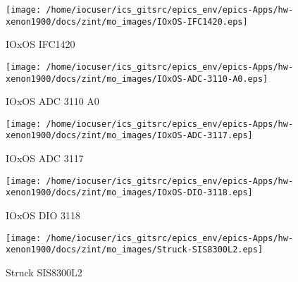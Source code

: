 \noindent
\vspace{1.4cm}
\begin{minipage}{.2\textwidth}
\begin{center}
\texttt{[image: /home/iocuser/ics\_gitsrc/epics\_env/epics-Apps/hw-xenon1900/docs/zint/mo\_images/IOxOS-IFC1420.eps]}
\end{center}
\end{minipage}
\begin{minipage}{.7\textwidth}
IOxOS IFC1420
\end{minipage}


\noindent
\vspace{1.4cm}
\begin{minipage}{.2\textwidth}
\begin{center}
\texttt{[image: /home/iocuser/ics\_gitsrc/epics\_env/epics-Apps/hw-xenon1900/docs/zint/mo\_images/IOxOS-ADC-3110-A0.eps]}
\end{center}
\end{minipage}
\begin{minipage}{.7\textwidth}
IOxOS ADC 3110 A0
\end{minipage}


\noindent
\vspace{1.4cm}
\begin{minipage}{.2\textwidth}
\begin{center}
\texttt{[image: /home/iocuser/ics\_gitsrc/epics\_env/epics-Apps/hw-xenon1900/docs/zint/mo\_images/IOxOS-ADC-3117.eps]}
\end{center}
\end{minipage}
\begin{minipage}{.7\textwidth}
IOxOS ADC 3117
\end{minipage}


\noindent
\vspace{1.4cm}
\begin{minipage}{.2\textwidth}
\begin{center}
\texttt{[image: /home/iocuser/ics\_gitsrc/epics\_env/epics-Apps/hw-xenon1900/docs/zint/mo\_images/IOxOS-DIO-3118.eps]}
\end{center}
\end{minipage}
\begin{minipage}{.7\textwidth}
IOxOS DIO 3118
\end{minipage}


\noindent
\vspace{1.4cm}
\begin{minipage}{.2\textwidth}
\begin{center}
\texttt{[image: /home/iocuser/ics\_gitsrc/epics\_env/epics-Apps/hw-xenon1900/docs/zint/mo\_images/Struck-SIS8300L2.eps]}
\end{center}
\end{minipage}
\begin{minipage}{.7\textwidth}
Struck SIS8300L2
\end{minipage}



